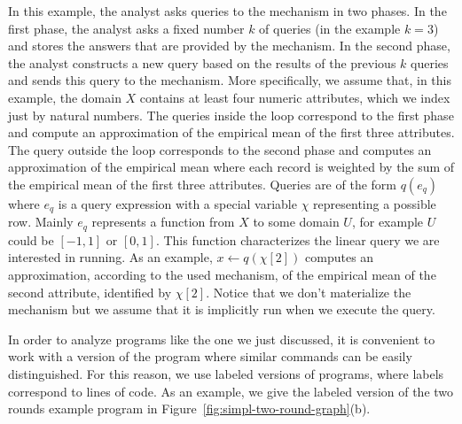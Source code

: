 In this example, the analyst asks queries to the mechanism in two phases. In the first phase,  the analyst asks a fixed number $k$ of queries (in the example $k=3$) and stores the answers that are provided by the mechanism. In the second phase, the analyst constructs a new query based on the results of the previous $k$ queries and sends this query to the mechanism. More specifically, we assume that, in this example, the domain $X$ contains at least four numeric attributes, which we index just by natural numbers. The queries inside the loop correspond to the first phase and compute an approximation of the empirical mean of the first three attributes. The query outside the loop corresponds to the second phase and computes an approximation of the empirical mean where each record is weighted by the sum of the empirical mean of the first three attributes. 
%
Queries are of the form $q(e_q)$ where $e_q$ is a query expression with a special variable $\chi$ representing a possible row. Mainly $e_q$ represents a function from $X$ to some domain $U$, for example $U$ could be $[-1,1]$ or $[0,1]$. This function characterizes the linear query we are interested in running. As an example, $x \leftarrow q(\chi[2])$ computes an approximation, according to the used mechanism, of the empirical mean of the second attribute, identified by $\chi[2]$. Notice that we don't materialize the mechanism but we assume that it is implicitly run when we execute the query.  


 In order to analyze programs like the one we just discussed, it is convenient to work with a version of the program where similar commands can be easily distinguished. For this reason, we use labeled versions of programs, where labels correspond to lines of code. As an example, we give the labeled version of the two rounds example program in Figure~\ref{fig:simpl-two-round-graph}(b).

